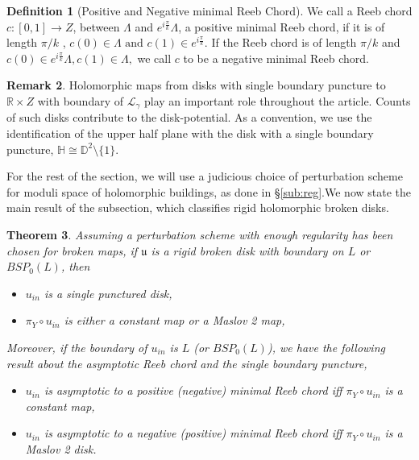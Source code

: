 \documentclass[11pt, oneside,dvipsnames]{amsart}
\newcommand{\of}{\circ}
\renewcommand{\to}{\rightarrow}
\renewcommand{\to}{\rightarrow}
\newcommand{\<}{\langle}
\renewcommand{\>}{\rangle}
\newcommand{\bD}{\mathbb{D}}
\newcommand{\bH}{\mathbb{H}}
\newcommand{\bR}{\mathbb{R}}
\newcommand{\cL}{\mathcal{L}}
\newcommand{\sm}{\ensuremath{\setminus}}
\renewcommand{\to}{\rightarrow}
\newtheorem{Theorem}{Theorem}[section]
\theoremstyle{definition}
\theoremstyle{definition}
\newtheorem{remark}[Theorem]{Remark}
\newtheorem{defn}[Theorem]{Definition}
\numberwithin{equation}{subsection}
\begin{document}
\begin{defn}[Positive and Negative minimal Reeb Chord]
    We call a Reeb chord $c: [0,1] \to Z$, between $\Lambda$ and $e^{i\frac{\pi}{k}}\Lambda$, a positive minimal Reeb chord, if it is of length $\pi/k$ , $c(0) \in  \Lambda \text{ and } c(1) \in e^{i\frac{\pi}{k}}. $ If the Reeb chord is of length $\pi/k$ and $c(0)\in e^{i\frac{\pi}{k}}\Lambda, c(1) \in \Lambda,$  we call $c$ to be a negative minimal Reeb chord.
\end{defn}


\begin{remark}
    Holomorphic maps from disks with single boundary puncture to $\bR \times Z$ with boundary of $\cL_\gamma$ play an important role throughout the article. Counts of such disks contribute to the disk-potential. As a convention, we use the identification of the upper half plane with the disk with a single boundary puncture, $\bH \cong \bD^2 \sm \{1\} $.
\end{remark}


For the rest of the section, we will use a judicious  choice of perturbation scheme for moduli space of holomorphic buildings, as done in \S \ref{sub:reg}.We now state the main result of the subsection, which classifies rigid holomorphic broken disks. 

\begin{Theorem}\label{classifthm}
    Assuming a perturbation scheme with enough regularity has been chosen for broken maps, if $\mathfrak{u}$ is a rigid broken disk with boundary on $L$ or $BSP_0(L)$, then \begin{itemize}
        \item $u_{in}$ is a single punctured disk,
        \item $\pi_Y \of u_{in}$ is either a constant map or a Maslov 2 map,
    \end{itemize}
Moreover, if the boundary of $u_{in}$ is $L$ (or $BSP_0(L)$), we have the following result about the asymptotic Reeb chord and the single boundary puncture,
\begin{itemize}
    \item $u_{in}$ is asymptotic to a positive (negative) minimal Reeb chord iff $\pi_Y\circ u_{in}$ is a constant map,
    \item  $u_{in}$ is asymptotic to a negative (positive) minimal Reeb chord iff $\pi_Y \of u_{in}$ is a Maslov 2 disk.
\end{itemize}
\end{Theorem}
\end{document}
